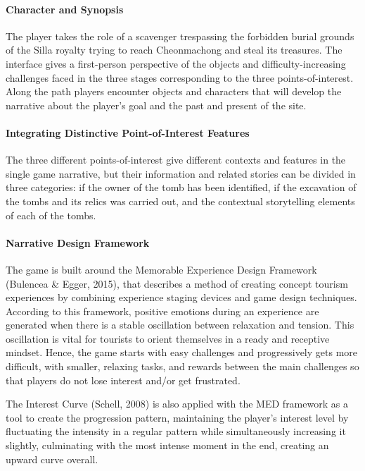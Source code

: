 \documentclass[runningheads]{llncs}
\begin{document}
\paragraph{Character and Synopsis} The player takes the role of a scavenger trespassing the forbidden burial grounds of the Silla royalty trying to reach Cheonmachong and steal its treasures. The interface gives a first-person perspective of the objects and difficulty-increasing challenges faced in the three stages corresponding to the three points-of-interest. Along the path players encounter objects and characters that will develop the narrative about the player's goal and the past and present of the site.
\paragraph{Integrating Distinctive Point-of-Interest Features} The three different points-of-interest give different contexts and features in the single game narrative, but their information and related stories can be divided in three categories: if the owner of the tomb has been identified, if the excavation of the tombs and its relics was carried out, and the contextual storytelling elements of each of the tombs.

\paragraph{Narrative Design Framework} The game is built around the Memorable Experience Design Framework (Bulencea \& Egger, 2015), that describes a method of creating concept tourism experiences by combining experience staging devices and game design techniques. According to this framework, positive emotions during an experience are generated when there is a stable oscillation between relaxation and tension. This oscillation is vital for tourists to orient themselves in a ready and receptive mindset. Hence, the game starts with easy challenges and progressively gets more difficult, with smaller, relaxing tasks, and rewards between the main challenges so that players do not lose interest and/or get frustrated.
\par The Interest Curve (Schell, 2008) is also applied with the MED framework as a tool to create the progression pattern, maintaining the player's interest level by fluctuating the intensity in a regular pattern while simultaneously increasing it slightly, culminating with the most intense moment in the end, creating an upward curve overall.
\end{document}
